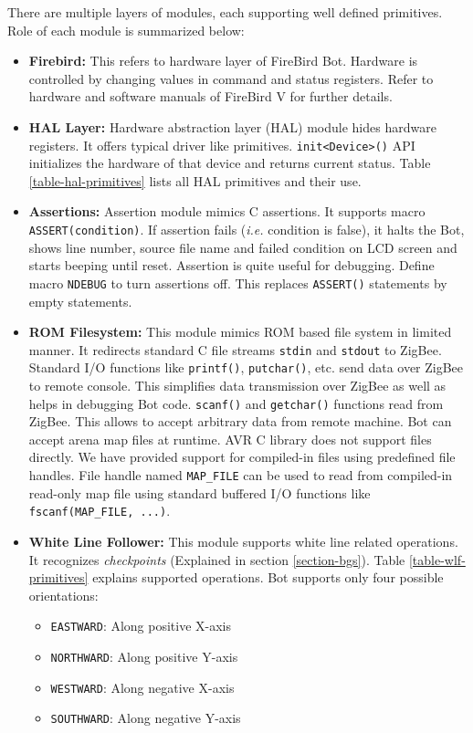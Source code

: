 \documentclass[a4paper, 12pt]{article}
\begin{document}
There are multiple layers of modules, each supporting well defined primitives. Role of each module is 
summarized below:
\begin{itemize}
 \item \textbf{Firebird:} This refers to hardware layer of FireBird Bot. Hardware is controlled by changing
  values in command and status registers. Refer to hardware \cite{fbhwmanual} and software \cite{fbswmanual} 
  manuals of FireBird V for further details.
  
  \item \textbf{HAL Layer:} Hardware abstraction layer (HAL) module hides hardware registers. It offers
  typical driver like primitives. \texttt{init<Device>()} API initializes the hardware of that device and 
  returns current status. Table \ref{table-hal-primitives} lists all HAL primitives and their use.
  
  \item \textbf{Assertions:} Assertion module mimics C assertions. It supports macro 
  \texttt{ASSERT(condition)}. If assertion fails (\emph{i.e.} condition is false), it halts the Bot, shows
  line number, source file name and failed condition on LCD screen and starts beeping until reset. Assertion
  is quite useful for debugging. Define macro \texttt{NDEBUG} to turn assertions off. This replaces \texttt{ASSERT()}
  statements by empty statements.
  
  \item \textbf{ROM Filesystem:} This module mimics ROM based file system in limited manner. It redirects standard
  C file streams \texttt{stdin} and \texttt{stdout} to ZigBee. Standard I/O functions  like \texttt{printf()}, \texttt{putchar()}, etc.
  send data over ZigBee to remote console. This simplifies data transmission over ZigBee
  as well as helps in debugging Bot code.  
  \texttt{scanf()} and \texttt{getchar()} functions read from ZigBee. This allows to accept arbitrary data from
  remote machine. Bot can accept arena map files at runtime.
  AVR C library does not support files directly. We have provided support for compiled-in files using predefined
  file handles. File handle named \texttt{MAP\_FILE} can be used to read from compiled-in read-only map file using
  standard buffered I/O functions like \texttt{fscanf(MAP\_FILE, ...)}.
  
  \item \textbf{White Line Follower:} This module supports white line related operations. It recognizes 
  \emph{checkpoints} (Explained in section \ref{section-bgs}). Table \ref{table-wlf-primitives} explains 
  supported operations. Bot supports only four possible orientations:
  \begin{itemize}
   \item \texttt{EASTWARD}: Along positive X-axis
   \item \texttt{NORTHWARD}: Along positive Y-axis
   \item \texttt{WESTWARD}: Along negative X-axis
   \item \texttt{SOUTHWARD}: Along negative Y-axis
  \end{itemize}

\end{itemize}
\end{document}
